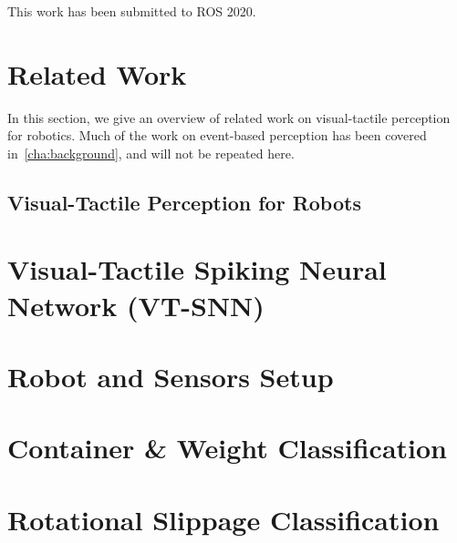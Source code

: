 \documentclass[fyp]{socreport}
\begin{document}
This work has been submitted to ROS 2020.

\section{Related Work\label{sec:snnrl_related}}

In this section, we give an overview of related work on visual-tactile perception for robotics. Much of the work on event-based perception has been covered in~\autoref{cha:background}, and will not be repeated here.

\subsection{Visual-Tactile Perception for Robots}


\section{Visual-Tactile Spiking Neural Network (VT-SNN)\label{sec:snnrl_vtsnn}}

\section{Robot and Sensors Setup\label{sec:snnrl_exp_setup}}

\section{Container \& Weight Classification\label{sec:snnrl_container_class}}

\section{Rotational Slippage Classification\label{sec:snnrl_slippage}}
\end{document}
